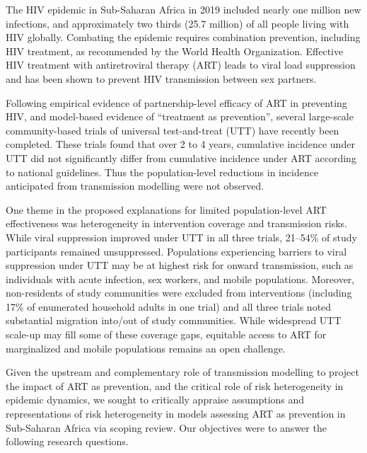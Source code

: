 The HIV epidemic in Sub-Saharan Africa in 2019 included nearly one million new infections,
and approximately two thirds (25.7 million) of all people living with HIV globally.\cite{AIDSinfo}
Combating the epidemic requires combination prevention, including HIV treatment,
as recommended by the World Health Organization.\cite{WHO2016ART}
Effective HIV treatment with antiretroviral therapy (ART) leads to
viral load suppression and has been shown to prevent HIV 
transmission between sex partners.\cite{Lundgren2015,Danel2015,Cohen2016} %
\par
Following empirical evidence of partnership-level efficacy of ART
in preventing HIV, \cite{Lundgren2015,Danel2015,Cohen2016}
and model-based evidence of ``treatment as prevention'',\cite{Granich2009,Eaton2012} %
several large-scale community-based trials of universal test-and-treat (UTT)
have recently been completed.\cite{Iwuji2018,Havlir2019,Hayes2019} %
These trials found that over 2 to 4 years,
cumulative incidence under UTT did not significantly differ from
cumulative incidence under ART according to national guidelines.\cite{Havlir2019,Hayes2019,Iwuji2018}
Thus the population-level reductions in incidence anticipated from transmission modelling were not observed.
\par
One theme in the proposed explanations for limited population-level ART effectiveness
was heterogeneity in intervention coverage and transmission risks.\cite{AbdoolKarim2019,Baral2019}
While viral suppression improved under UTT in all three trials,
21--54\% of study participants remained unsuppressed.\cite{Iwuji2018,Havlir2019,Hayes2019}
Populations experiencing barriers to viral suppression under UTT
may be at highest risk for onward transmission, such as
individuals with acute infection, sex workers, and mobile populations.\cite{Tanser2015,Hakim2018,Nyato2019}
Moreover, non-residents of study communities were excluded from interventions
(including 17\% of enumerated household adults in one trial\cite{Havlir2019})
and all three trials noted substantial migration into/out of study communities.
\cite{Iwuji2018,Havlir2019,Hayes2019}
While widespread UTT scale-up may fill some of these coverage gaps,
equitable access to ART for marginalized and mobile populations remains an open challenge.
\cite{Tanser2015,deGruchy2020}
\par
Given the upstream and complementary role of transmission modelling
to project the impact of ART as prevention,\cite{Eaton2012,Delva2012}
and the critical role of risk heterogeneity in epidemic dynamics,
we sought to critically appraise assumptions and representations of risk heterogeneity
in models assessing ART as prevention in Sub-Saharan Africa via scoping review.
Our objectives were to answer the following research questions.

